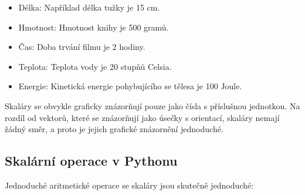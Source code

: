 \documentclass[letterpaper,10pt,english]{jupyterBook}
\begin{document}
\sphinxAtStartPar
{}
\begin{itemize}
\item {} 
\sphinxAtStartPar
Délka: Například délka tužky je 15 cm.

\item {} 
\sphinxAtStartPar
Hmotnost: Hmotnost knihy je 500 gramů.

\item {} 
\sphinxAtStartPar
Čas: Doba trvání filmu je 2 hodiny.

\item {} 
\sphinxAtStartPar
Teplota: Teplota vody je 20 stupňů Celsia.

\item {} 
\sphinxAtStartPar
Energie: Kinetická energie pohybujícího se tělesa je 100 Joule.

\end{itemize}

\sphinxAtStartPar
{}
Skaláry se obvykle graficky znázorňují pouze jako čísla s příslušnou jednotkou. Na rozdíl od vektorů, které se znázorňují jako úsečky s orientací, skaláry nemají žádný směr, a proto je jejich grafické znázornění jednoduché.


\subsection{Skalární operace v Pythonu}
\label{\detokenize{Prednasky/0_2_Skal_xe1ry_a_vektory:skalarni-operace-v-pythonu}}
\sphinxAtStartPar
Jednoduché aritmetické operace se skaláry jsou skutečně jednoduché:
\end{document}

